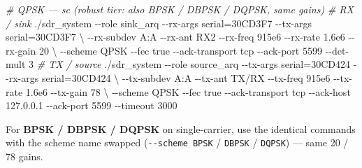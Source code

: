 \documentclass[
  10pt,
]{article}
\newenvironment{Shaded}{\begin{snugshade}}{\end{snugshade}}
\newcommand{\AttributeTok}[1]{\textcolor[rgb]{0.77,0.63,0.00}{#1}}
\newcommand{\CommentTok}[1]{\textcolor[rgb]{0.56,0.35,0.01}{\textit{#1}}}
\newcommand{\DataTypeTok}[1]{\textcolor[rgb]{0.13,0.29,0.53}{#1}}
\newcommand{\ExtensionTok}[1]{#1}
\newcommand{\NormalTok}[1]{#1}
\begin{document}
\begin{Shaded}
\begin{Highlighting}[]
\CommentTok{\# QPSK — sc   (robust tier: also BPSK / DBPSK / DQPSK, same gains)}
\CommentTok{\# RX / sink}
\ExtensionTok{./sdr\_system} \AttributeTok{{-}{-}role}\NormalTok{ sink\_arq }\AttributeTok{{-}{-}rx{-}args}\NormalTok{ serial=30CD3F7 }\AttributeTok{{-}{-}tx{-}args}\NormalTok{ serial=30CD3F7 }\DataTypeTok{\textbackslash{}}
  \AttributeTok{{-}{-}rx{-}subdev}\NormalTok{ A:A }\AttributeTok{{-}{-}rx{-}ant}\NormalTok{ RX2 }\AttributeTok{{-}{-}rx{-}freq}\NormalTok{ 915e6 }\AttributeTok{{-}{-}rx{-}rate}\NormalTok{ 1.6e6 }\AttributeTok{{-}{-}rx{-}gain}\NormalTok{ 20 }\DataTypeTok{\textbackslash{}}
  \AttributeTok{{-}{-}scheme}\NormalTok{ QPSK }\AttributeTok{{-}{-}fec}\NormalTok{ true }\AttributeTok{{-}{-}ack{-}transport}\NormalTok{ tcp }\AttributeTok{{-}{-}ack{-}port}\NormalTok{ 5599 }\AttributeTok{{-}{-}det{-}mult}\NormalTok{ 3}
\CommentTok{\# TX / source}
\ExtensionTok{./sdr\_system} \AttributeTok{{-}{-}role}\NormalTok{ source\_arq }\AttributeTok{{-}{-}tx{-}args}\NormalTok{ serial=30CD424 }\AttributeTok{{-}{-}rx{-}args}\NormalTok{ serial=30CD424 }\DataTypeTok{\textbackslash{}}
  \AttributeTok{{-}{-}tx{-}subdev}\NormalTok{ A:A }\AttributeTok{{-}{-}tx{-}ant}\NormalTok{ TX/RX }\AttributeTok{{-}{-}tx{-}freq}\NormalTok{ 915e6 }\AttributeTok{{-}{-}tx{-}rate}\NormalTok{ 1.6e6 }\AttributeTok{{-}{-}tx{-}gain}\NormalTok{ 78 }\DataTypeTok{\textbackslash{}}
  \AttributeTok{{-}{-}scheme}\NormalTok{ QPSK }\AttributeTok{{-}{-}fec}\NormalTok{ true }\AttributeTok{{-}{-}ack{-}transport}\NormalTok{ tcp }\AttributeTok{{-}{-}ack{-}host}\NormalTok{ 127.0.0.1 }\AttributeTok{{-}{-}ack{-}port}\NormalTok{ 5599 }\AttributeTok{{-}{-}timeout}\NormalTok{ 3000}
\end{Highlighting}
\end{Shaded}

For \textbf{BPSK / DBPSK / DQPSK} on single-carrier, use the identical
commands with the scheme name swapped (\texttt{-\/-scheme\ BPSK} /
\texttt{DBPSK} / \texttt{DQPSK}) --- same 20 / 78 gains.
\end{document}
